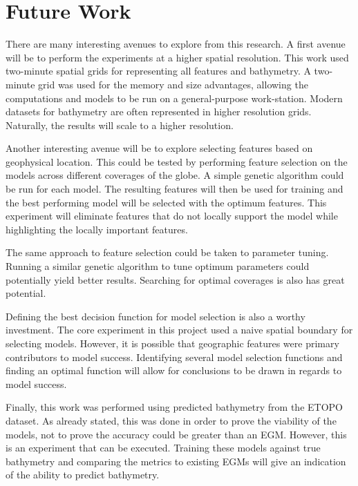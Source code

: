 \section{Future Work}
\setlength{\parindent}{10ex}
There are many interesting avenues to explore from this research.
A first avenue will be to perform the experiments at a higher spatial resolution.
This work used two-minute spatial grids for representing all features and bathymetry.
A two-minute grid was used for the memory and size advantages, allowing the computations and models to be run on a general-purpose work-station.
Modern datasets for bathymetry are often represented in higher resolution grids.
Naturally, the results will scale to a higher resolution.

\par
Another interesting avenue will be to explore selecting features based on geophysical location.
This could be tested by performing feature selection on the models across different coverages of the globe.
A simple genetic algorithm could be run for each model.
The resulting features will then be used for training and the best performing model will be selected with the optimum features.
This experiment will eliminate features that do not locally support the model while highlighting the locally important features.

\par
The same approach to feature selection could be taken to parameter tuning.
Running a similar genetic algorithm to tune optimum parameters could potentially yield better results.
Searching for optimal coverages is also has great potential.

\par 
Defining the best decision function for model selection is also a worthy investment.
The core experiment in this project used a naive spatial boundary for selecting models.
However, it is possible that geographic features were primary contributors to model success.
Identifying several model selection functions and finding an optimal function will allow for conclusions to be drawn in regards to model success.

\par
Finally, this work was performed using predicted bathymetry from the ETOPO dataset.
As already stated, this was done in order to prove the viability of the models, not to prove the accuracy could be greater than an \ac{EGM}.
However, this is an experiment that can be executed.
Training these models against true bathymetry and comparing the metrics to existing \ac{EGM}s will give an indication of the ability to predict bathymetry.